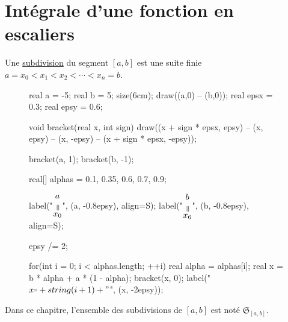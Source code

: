 \part{Intégrale d'une fonction en escaliers}

\begin{defn}
	Une \underline{subdivision} du segment $[a,b]$ est une suite finie $a = x_0 < x_1 < x_2 < \cdots < x_n = b$.

	\begin{figure}[H]
		\centering
		\begin{asy}
			real a = -5;
			real b = 5;
			size(6cm);
			draw((a,0) -- (b,0));
			real epsx = 0.3;
			real epsy = 0.6;

			void bracket(real x, int sign) {
				draw((x + sign * epsx, epsy) -- (x, epsy) -- (x, -epsy) -- (x + sign * epsx, -epsy));
			}

			bracket(a, 1);
			bracket(b, -1);

			real[] alphas = {0.1, 0.35, 0.6, 0.7, 0.9};

			label("$\substack{\displaystyle a\\[0.4mm]\displaystyle \vrt=\\[0.4mm]\displaystyle x_0}$", (a, -0.8epsy), align=S);
			label("$\substack{\displaystyle b\\[0.4mm]\displaystyle \vrt=\\[0.4mm]\displaystyle x_6}$", (b, -0.8epsy), align=S);

			epsy /= 2;

			for(int i = 0; i < alphas.length; ++i) {
				real alpha = alphas[i];
				real x = b * alpha + a * (1 - alpha);
				bracket(x, 0);
				label("$x_" + string(i+1) + "$", (x, -2epsy));
			}
		\end{asy}
	\end{figure}
	\vspace{3mm}
\end{defn}

\begin{rmk}[Notation]
	Dans ce chapitre, l'ensemble des subdivisions de $[a,b]$ est noté $\mathfrak{S}_{[a,b]}$.
\end{rmk}

